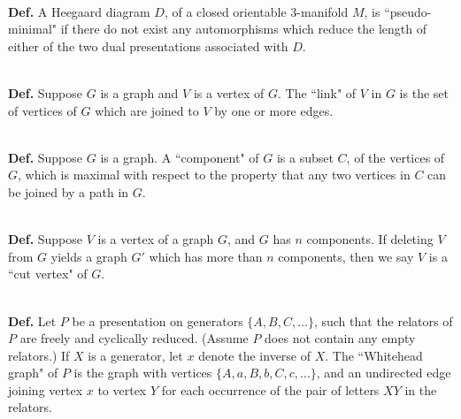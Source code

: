 \documentclass[12pt]{amsart}
\newcommand{\definition}{\ \\ \noindent \textbf{Def.} }
\begin{document}
\definition     A Heegaard diagram $D$, of a closed orientable 3-manifold $M$, is ``pseudo-minimal" if
        there do not exist any automorphisms which reduce the length of either of the two dual
        presentations associated with $D$.

\definition     Suppose $G$ is a graph and $V$ is a vertex of $G$. The ``link" of $V$ in $G$ is the set of
        vertices of $G$ which are joined to $V$ by one or more edges.
                                                
\definition     Suppose $G$ is a graph. A ``component" of $G$ is a subset $C$, of the vertices of $G$, which
        is maximal with respect to the property that any two vertices in $C$ can be joined by a
        path in $G$.

\definition     Suppose $V$ is a vertex of a graph $G$, and $G$ has $n$ components. If deleting $V$ from $G$
        yields a graph $G'$ which has more than $n$ components, then we say $V$ is a ``cut vertex"
        of $G$.
        
\definition     Let $P$ be a presentation on generators $\{ A,B,C,  \ldots \}$, such that the relators of $P$
        are freely and cyclically reduced. (Assume $P$ does not contain any empty relators.)
        If $X$ is a generator, let $x$ denote the inverse of $X$. The ``Whitehead graph" of $P$ is the
        graph with vertices $\{ A,a,B,b,C,c,  \ldots \}$, and an undirected edge joining vertex $x$ to
        vertex $Y$ for each occurrence of the pair of letters $XY$ in the relators.
        
\end{document}
